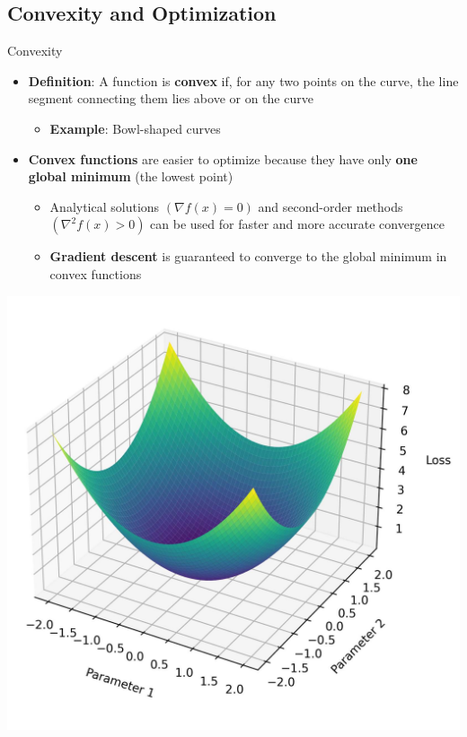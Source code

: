 \documentclass[serif, aspectratio=169]{beamer}
\begin{document}
\subsection{Convexity and Optimization}
\begin{frame}{Convexity}
    \begin{minipage}{0.6\linewidth}
        \begin{itemize}
            \item \textbf{Definition}: A function is \textbf{convex} if, for any two points on the curve, the line segment connecting them lies above or on the curve
            \begin{itemize}
                \item \textbf{Example}: Bowl-shaped curves
            \end{itemize}
            \item \textbf{Convex functions} are easier to optimize because they have only \textbf{one global minimum} (the lowest point)
            \begin{itemize}
                \item Analytical solutions $(\nabla f(x) = 0)$ and second-order methods $(\nabla^2 f(x) > 0)$ can be used for faster and more accurate convergence
                \item \textbf{Gradient descent} is guaranteed to converge to the global minimum in convex functions
            \end{itemize}
        \end{itemize}
    \end{minipage}%
    \hfill
    \begin{minipage}{0.4\linewidth}
        \centering
        \includegraphics[height=.6\textheight]{pic/loss_convex.jpg}
    \end{minipage}
\end{frame}
\end{document}
